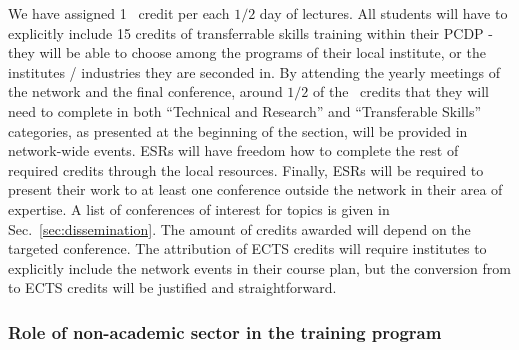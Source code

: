 We have assigned 1 \acronym\ credit per each $1/2$ day of lectures. 
All students will have to explicitly include 15 credits of transferrable skills training within their PCDP - they will be able to choose among the programs of their local institute, or the institutes / industries they are seconded in. 
By attending the yearly meetings of the network and the final conference, around $1/2$ of the \acronym\ credits that they will need to complete in both ``Technical and Research'' and ``Transferable Skills'' categories, as presented at the beginning of the section, will be provided in network-wide events. 
ESRs will have freedom how to complete the rest of required credits through the local resources. 
Finally, ESRs will be required to present their work to at least one conference outside the network in their area of expertise. 
A list of conferences of interest for \acronym topics is given in Sec.~\ref{sec:dissemination}.
The amount of credits awarded will depend on the targeted conference.  
The attribution of ECTS credits will require institutes to explicitly include the network events in their course plan, but the conversion from \acronym to ECTS credits will be justified and straightforward. 

\vspace{-5mm}


\subsubsection{Role of non-academic sector in the training program}

